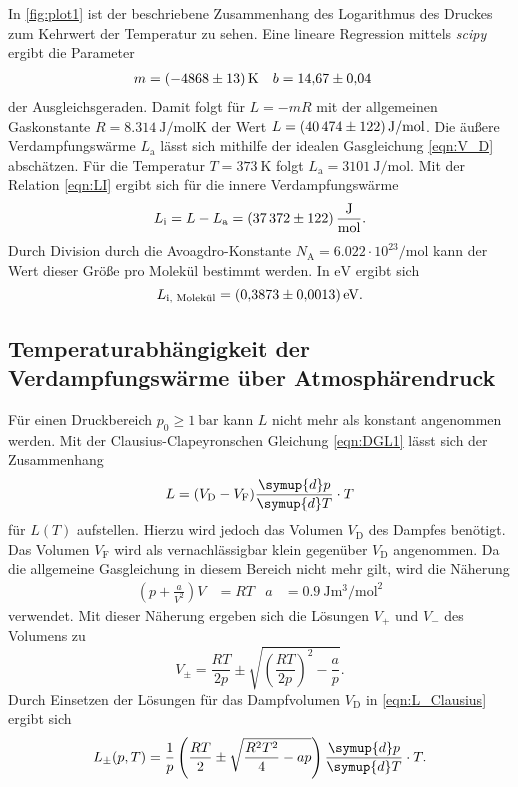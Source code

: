 In \autoref{fig:plot1} ist der beschriebene Zusammenhang des Logarithmus des Druckes zum Kehrwert der Temperatur zu sehen. Eine lineare Regression mittels \textit{scipy} 
\cite{scipy} ergibt die Parameter
\begin{align*}
    m &= \qty{-4868 +- 13}{\kelvin} & b &= \num{14.67 +- 0.04}
\end{align*}
der Ausgleichsgeraden. Damit folgt für $L = -mR$ mit der allgemeinen Gaskonstante $R = \qty{8.314}{\joule\per\mol\kelvin}$ \cite{scipy} der Wert 
$L = \qty{40474 +- 122}{\joule\per\mol}$. Die äußere Verdampfungswärme $L_\text{a}$ lässt sich mithilfe der idealen Gasgleichung \eqref{eqn:V_D} abschätzen. Für die Temperatur
$T = \qty{373}{\kelvin}$ folgt $L_\text{a} = \qty{3101}{\joule\per\mol}$. Mit der Relation \eqref{eqn:LI} ergibt sich für die innere Verdampfungswärme
\begin{equation*}
    L_\text{i} = L - L_\text{a} = \qty{37372+-122}{\joule\per\mol}.
\end{equation*}
Durch Division durch die Avoagdro-Konstante $N_\text{A} = 6.022 \cdot 10^23 \unit{\per\mol}$ \cite{scipy} kann der Wert dieser Größe pro Molekül bestimmt werden.
In $\unit{\electronvolt}$ ergibt sich
\begin{equation*}
    L_\text{i, Molekül} = \qty{0.3873+- 0.0013}{\electronvolt}.
\end{equation*}

\subsection{Temperaturabhängigkeit der Verdampfungswärme über Atmosphärendruck}
\label{subsec:A_Temperaturabhäng}
Für einen Druckbereich $p_0 \geq \qty{1}{\bar}$ kann $L$ nicht mehr als konstant angenommen werden. Mit der Clausius-Clapeyronschen Gleichung \eqref{eqn:DGL1}
lässt sich der Zusammenhang 
\begin{equation}
    \label{eqn:L_Clausius}
    L = (V_\text{D} - V_\text{F}) \frac{\symup{d}p}{\symup{d}T} \cdot T
\end{equation}
für $L(T)$ aufstellen. Hierzu wird jedoch das Volumen $V_\text{D}$ des Dampfes benötigt. Das Volumen $V_\text{F}$ wird als vernachlässigbar
klein gegenüber $V_\text{D}$ angenommen. Da die allgemeine Gasgleichung in diesem Bereich nicht mehr gilt, wird die Näherung 
\begin{align*}
    \left(p + \frac{a}{V^2}\right)V &= RT & a &= \qty{0.9}{\joule\cubic\metre\per\mol\squared}
\end{align*}
verwendet. Mit dieser Näherung ergeben sich die Lösungen $V_+$ und $V_-$ des Volumens zu 
\begin{equation*}
    V_\pm = \frac{RT}{2p} \pm \sqrt{\left(\frac{RT}{2p}\right)^2-\frac{a}{p}}.
\end{equation*}
Durch Einsetzen der Lösungen für das Dampfvolumen $V_\text{D}$ in \autoref{eqn:L_Clausius} ergibt sich
\begin{equation}
    L_\pm(p, T) = \frac{1}{p}\left(\frac{RT}{2} \pm \sqrt{\frac{R^2T^2}{4}- ap} \right) \frac{\symup{d}p}{\symup{d}T} \cdot T.
\end{equation} 

